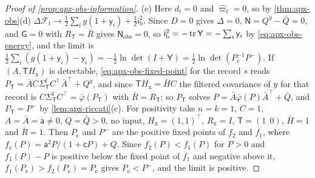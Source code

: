\begin{proof}[Proof of \cref{prop:apx-obs-information}]
(e) Here $d_t=0$ and $\hat\varpi_t=0$, so by \cref{thm:apx-obs}(d) $\Delta\mathcal F_t\to\frac12\sum_ig(1+\mathsf y_i)+\frac12\mathsf i_{\mathrm b}^2$. Since $D=0$ gives $\Delta=0$, $\mathsf N=Q^y-\bar Q=0$, and $\mathsf G=0$ with $R_{\mathsf T}=\bar R$ gives $\mathsf N_{\mathrm{obs}}=0$, so $\mathsf i_{\mathrm b}^2=-\operatorname{tr}\mathsf Y=-\sum_i\mathsf y_i$ by \eqref{eq:apx-obs-energy}, and the limit is $\frac12\sum_i(g(1+\mathsf y_i)-\mathsf y_i)=-\frac12\ln\det(I+\mathsf Y)=\frac12\ln\det(P_{\mathrm e}^{-1}P^-)$. If $(A,\mathsf TH_{\mathrm x})$ is detectable, \eqref{eq:apx-obs-fixed-point} for the record $s$ reads $P_{\mathsf T}=\bar AC\Sigma^{\mathrm f}_{\mathsf T}C^\top\bar A^\top+Q^y$, and since $\mathsf TH_{\mathrm x}=\bar HC$ the filtered covariance of $y$ for that record is $C\Sigma^{\mathrm f}_{\mathsf T}C^\top=\bar\varphi(P_{\mathsf T})$ with $\bar R=R_{\mathsf T}$; so $P_{\mathsf T}$ solves $P=\bar A\bar\varphi(P)\bar A^\top+\bar Q$, and $P_{\mathsf T}=P^-$ by \cref{lem:apx-riccati}(c). For positivity take $n=k=1$, $C=1$, $A=\bar A=\mathsf a\ne0$, $Q=\bar Q>0$, no input, $H_{\mathrm x}=(1,1)^\top$, $R_{\mathrm x}=I$, $\mathsf T=(1\ \ 0)$, $\bar H=1$ and $\bar R=1$. Then $P_{\mathrm e}$ and $P^-$ are the positive fixed points of $f_2$ and $f_1$, where $f_{\mathsf c}(P)=\mathsf a^2P/(1+\mathsf cP)+Q$. Since $f_2(P)<f_1(P)$ for $P>0$ and $f_1(P)-P$ is positive below the fixed point of $f_1$ and negative above it, $f_1(P_{\mathrm e})>f_2(P_{\mathrm e})=P_{\mathrm e}$ gives $P_{\mathrm e}<P^-$, and the limit is positive.
\end{proof}

